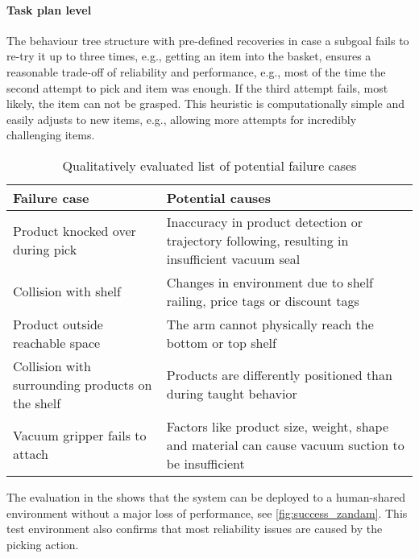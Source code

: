 \paragraph{Task plan level} The behaviour tree structure with pre-defined recoveries in case a subgoal fails to re-try it up to three times, e.g., getting an item into the basket, ensures a reasonable trade-off of reliability and performance, e.g., most of the time the second attempt to pick and item was enough. If the third attempt fails, most likely, the item can not be grasped. This heuristic is computationally simple and easily adjusts to new items, e.g., allowing more attempts for incredibly challenging items.
\begin{table*}[t]
    \centering
    \begin{tabular}{p{5.5cm}p{11cm}}
        \toprule
        Failure case & Potential causes \\
        \midrule
        Product knocked over during pick & Inaccuracy in product detection or trajectory following, resulting in insufficient vacuum seal \\
        Collision with shelf & Changes in environment due to shelf railing, price tags or discount tags \\
        Product outside reachable space  & The arm cannot physically reach the bottom or top shelf \\
        Collision with surrounding products on the shelf & Products are differently positioned than during taught behavior \\
        Vacuum gripper fails to attach & Factors like product size, weight, shape and material can cause vacuum suction to be insufficient \\
        \bottomrule
    \end{tabular}
    \caption{Qualitatively evaluated list of potential failure cases}
    \label{tab:failure_cases}
\end{table*}


The evaluation in the \realsupermarket{} shows that the system
can be deployed to a human-shared environment without a major loss of performance, see
\cref{fig:success_zandam}. This test environment also
confirms that most reliability issues are caused by the
picking action.








